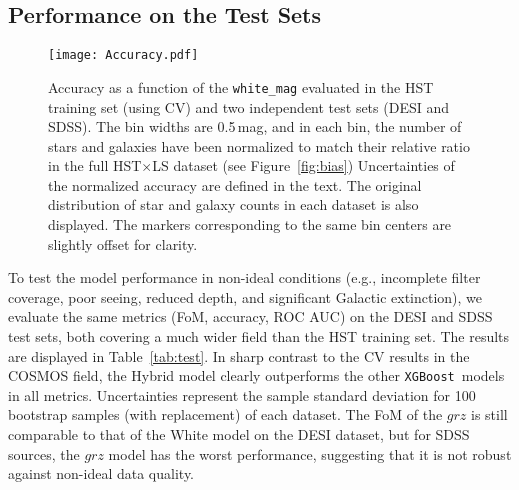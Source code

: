 \documentclass[twocolumn,tighten]{aastex631}
\newcommand{\xgboost}{\texttt{XGBoost}}
\begin{document}
\begin{CJK*}{UTF8}{gbsn}
\subsection{Performance on the Test Sets}\label{sec:test_performance}

\begin{figure*}
    \centering
    \texttt{[image: Accuracy.pdf]}
    \caption{Accuracy as a function of the \texttt{white\_mag} evaluated in the HST training set (using CV) and two independent test sets (DESI and SDSS). The bin widths are 0.5\,mag, and in each bin, the number of stars and galaxies have been normalized to match their relative ratio in the full HST$\times$LS dataset (see Figure~\ref{fig:bias}) 
    Uncertainties of the normalized accuracy are defined in the text. The original distribution of star and galaxy counts in each dataset is also displayed. The markers corresponding to the same bin centers are slightly offset for clarity.}
    \label{fig:acc}
\end{figure*}

To test the model performance in non-ideal conditions (e.g., incomplete filter coverage, poor seeing, reduced depth, and significant Galactic extinction), we evaluate the same metrics (FoM, accuracy, ROC AUC) on the DESI and SDSS test sets, both covering a much wider field than the HST training set. The results are displayed in Table~\ref{tab:test}. In sharp contrast to the CV results in the COSMOS field, the Hybrid model clearly outperforms the other \xgboost\ models in all metrics. Uncertainties represent the sample standard deviation for 100 bootstrap samples (with replacement) of each dataset. The FoM of the $grz$ is still comparable to that of the White model on the DESI dataset, but for SDSS sources, the $grz$ model has the worst performance, suggesting that it is not robust against non-ideal data quality.


\end{CJK*}
\end{document}
